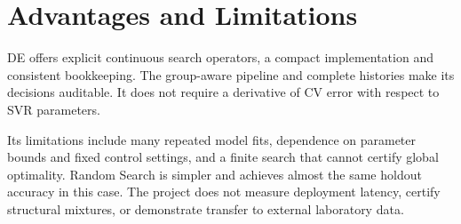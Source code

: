 \section{Advantages and Limitations}
DE offers explicit continuous search operators, a compact implementation and consistent bookkeeping. The group-aware pipeline and complete histories make its decisions auditable. It does not require a derivative of CV error with respect to SVR parameters.

Its limitations include many repeated model fits, dependence on parameter bounds and fixed control settings, and a finite search that cannot certify global optimality. Random Search is simpler and achieves almost the same holdout accuracy in this case. The project does not measure deployment latency, certify structural mixtures, or demonstrate transfer to external laboratory data.
